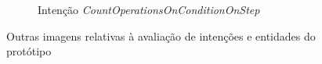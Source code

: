 \begin{figure}[!ht]
\begin{subfigure}{.48\textwidth}
        \caption{Intenção \textit{CountOperationsOnConditionOnStep}}
     \end{subfigure}
\caption{Outras imagens relativas à avaliação de intenções e entidades do protótipo}
\label{fig:nlcomprehesion_others}
\end{figure}